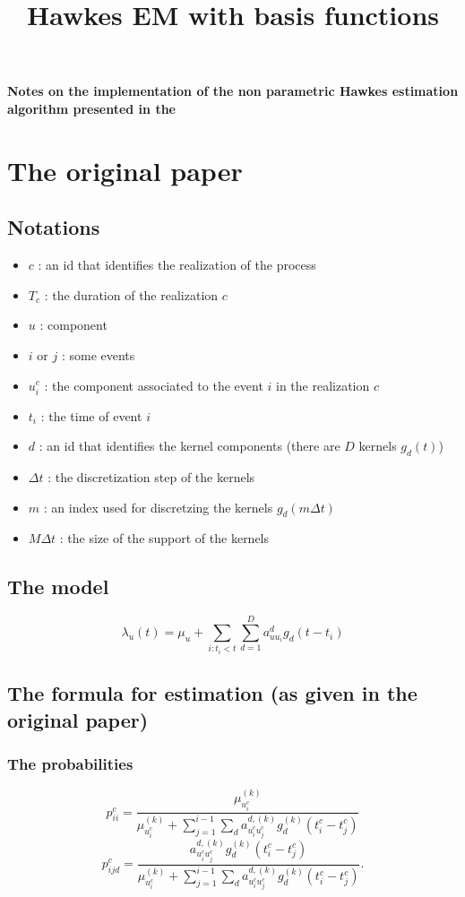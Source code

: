 \documentclass[11pt]{article}%
\title{Hawkes EM with basis functions}
\date{\vspace{-5ex}} %
\begin{document}
\maketitle

\noindent
{\bf Notes on the implementation of the non parametric Hawkes estimation
algorithm presented in the \citep{zhou2013learning}
}

\vskip 1cm
\section{The original paper}
\subsection{Notations}
\begin{itemize}
\item $c$ : an id that identifies the realization of the process
\item $T_c$ : the duration of the realization $c$
\item $u$ : component
\item $i$ or $j$ : some events
\item $u_i^c$ : the component associated to the event $i$ in the realization $c$
\item $t_i$ : the time of event $i$
\item $d$ : an id that identifies the kernel components (there are $D$ kernels $g_d(t)$)
\item $\Delta t$ : the discretization step of the kernels
\item $m$ : an index used for discretzing the kernels $g_d(m\Delta t)$
\item $M\Delta t$ : the size of the support of the kernels
\end{itemize}
\subsection{The model}
\begin{equation}
\lambda_u(t) = \mu_u + \sum_{i:t_i<t} \sum_{d=1}^D a_{uu_i}^d g_d(t-t_i) 
\end{equation}
\subsection{The formula for estimation (as given in the original paper)}
\subsubsection{The probabilities}
\begin{equation}
p_{ii}^c = 
\frac
{\mu_{u_i^c}^{(k)}}
{\mu_{u_i^c}^{(k)} + \sum_{j=1}^{i-1}\sum_d a_{u_i^cu_j^c}^{d,(k)}g_d^{(k)}(t_i^c-t_j^c)}
\end{equation}
\begin{equation}
p_{ijd}^c = 
\frac
{a_{u_i^cu_j^c}^{d,(k)} g_d^{(k)}(t_i^c - t_j^c)}
{\mu_{u_i^c}^{(k)} + \sum_{j=1}^{i-1}\sum_d a_{u_i^cu_j^c}^{d,(k)}g_d^{(k)}(t_i^c-t_j^c)}.
\end{equation}
\end{document}
